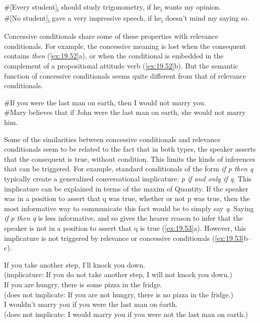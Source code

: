 \ea \label{ex:19.51}
\ea  \#[Every student]\textsubscript{i} should study trigonometry, if he\textsubscript{i} wants my opinion.\\
\ex \#[No student]\textsubscript{i} gave a very impressive speech, if he\textsubscript{i} doesn’t mind my saying so.
\z
\z

Concessive conditionals share some of these properties with relevance conditionals. For example, the concessive meaning is lost when the consequent contains \textit{then} (\ref{ex:19.52}a), or when the conditional is embedded in the complement of a propositional attitude verb (\ref{ex:19.52}b). But the semantic function of concessive conditionals seems quite different from that of relevance conditionals.


\ea \label{ex:19.52}
\ea  \#If you were the last man on earth, then I would not marry you.\\
\ex \#Mary believes that if John were the last man on earth, she would not marry him.
\z
\z


Some of the similarities between concessive conditionals and relevance conditionals seem to be related to the fact that in both types, the speaker asserts that the consequent is true, without condition. This limits the kinds of inferences that can be triggered. For example, standard conditionals of the form \textit{if} \textit{p then q} typically create a generalized conversational implicature: \textit{p if and only if q}. This implicature can be explained in terms of the maxim of Quantity. If the speaker was in a position to assert that q was true, whether or not p was true, then the most informative way to communicate this fact would be to simply say \textit{q}. Saying \textit{if} \textit{p then q} is less informative, and so gives the hearer reason to infer that the speaker is not in a position to assert that q is true (\ref{ex:19.53}a). However, this implicature is not triggered by relevance or concessive conditionals (\ref{ex:19.53}b--c).


\ea \label{ex:19.53}
\ea  If you take another step, I’ll knock you down.\\
  (implicature: If you do not take another step, I will not knock you down.)\\
\ex If you are hungry, there is some pizza in the fridge.\\
  (does not implicate: If you are not hungry, there is no pizza in the fridge.)\\
\ex I wouldn’t marry you if you were the last man on éarth.\\
  (does not implicate: I would marry you if you were not the last man on earth.)
\z
\z


